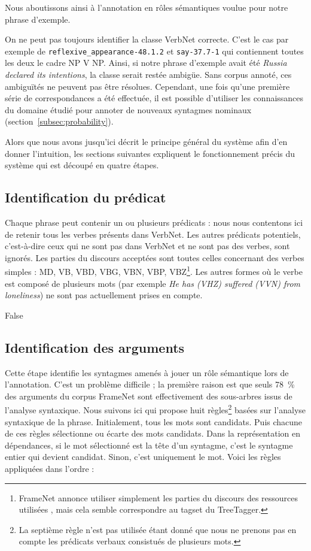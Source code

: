 Nous aboutissons ainsi à l'annotation en rôles sémantiques voulue pour notre
phrase d'exemple.

On ne peut pas toujours identifier la classe VerbNet correcte. C'est le cas par
exemple de \texttt{reflexive\_appearance-48.1.2} et \texttt{say-37.7-1} qui
contiennent toutes les deux le cadre NP V NP. Ainsi, si notre phrase d'exemple
avait été \textit{Russia declared its intentions}, la classe serait restée
ambigüe. Sans corpus annoté, ces ambiguïtés ne peuvent pas être résolues.
Cependant, une fois qu'une première série de correspondances a été effectuée,
il est possible d'utiliser les connaissances du domaine étudié pour annoter de
nouveaux syntagmes nominaux (section~\ref{subsec:probability}).

Alors que nous avons jusqu'ici décrit le principe général du système afin d'en
donner l'intuition, les sections suivantes expliquent le fonctionnement précis
du système qui est découpé en quatre étapes.

\subsection{Identification du prédicat}

Chaque phrase peut contenir un ou plusieurs prédicats : nous nous contentons
ici de retenir tous les verbes présents dans VerbNet. Les autres prédicats
potentiels, c'est-à-dire ceux qui ne sont pas dans VerbNet et ne sont pas des
verbes, sont ignorés. Les parties du discours acceptées sont toutes celles
concernant des verbes simples : MD, VB, VBD, VBG, VBN, VBP,
VBZ\footnote{FrameNet annonce utiliser simplement les parties du discours des
    ressources utilisées \citep[section~3.1]{ruppenhofer2006extended}, mais
    cela semble correspondre au tagset du TreeTagger.}. Les autres formes où le
    verbe est composé de plusieurs mots (par exemple \textit{He has (VHZ)
    suffered (VVN) from loneliness}) ne sont pas actuellement prises en compte.

\if False

\subsection{Identification des arguments}

Cette étape identifie les syntagmes amenés à jouer un rôle sémantique lors de
l'annotation. C'est un problème difficile ; la première raison est que seuls
78~\% des arguments du corpus FrameNet sont effectivement des sous-arbres issus
de l'analyse syntaxique. Nous suivons ici \cite{lang2011unsupervised} qui
propose huit règles\footnote{La septième règle n'est pas utilisée étant donné
    que nous ne prenons pas en compte les prédicats verbaux consistués de
plusieurs mots.} basées sur l'analyse syntaxique de la phrase. Initialement,
tous les mots sont candidats. Puis chacune de ces règles sélectionne ou écarte
des mots candidats. Dans la représentation en dépendances, si le mot
sélectionné est la tête d'un syntagme, c'est le syntagme entier qui devient
candidat. Sinon, c'est uniquement le mot.  Voici les règles appliquées dans
l'ordre :

